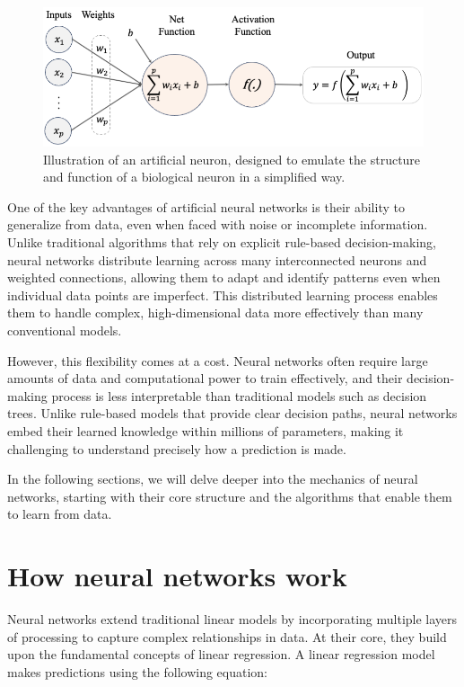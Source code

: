 \documentclass[
]{book}
\theoremstyle{definition}
\theoremstyle{definition}
\theoremstyle{definition}
\theoremstyle{definition}
\theoremstyle{remark}
\begin{document}
\begin{figure}

{\centering \includegraphics[width=0.9\linewidth]{images/net_1} 

}

\caption{Illustration of an artificial neuron, designed to emulate the structure and function of a biological neuron in a simplified way.}\label{fig:net-1}
\end{figure}

One of the key advantages of artificial neural networks is their ability to generalize from data, even when faced with noise or incomplete information. Unlike traditional algorithms that rely on explicit rule-based decision-making, neural networks distribute learning across many interconnected neurons and weighted connections, allowing them to adapt and identify patterns even when individual data points are imperfect. This distributed learning process enables them to handle complex, high-dimensional data more effectively than many conventional models.

However, this flexibility comes at a cost. Neural networks often require large amounts of data and computational power to train effectively, and their decision-making process is less interpretable than traditional models such as decision trees. Unlike rule-based models that provide clear decision paths, neural networks embed their learned knowledge within millions of parameters, making it challenging to understand precisely how a prediction is made.

In the following sections, we will delve deeper into the mechanics of neural networks, starting with their core structure and the algorithms that enable them to learn from data.

\section{How neural networks work}\label{how-neural-networks-work}

Neural networks extend traditional linear models by incorporating multiple layers of processing to capture complex relationships in data. At their core, they build upon the fundamental concepts of linear regression. A linear regression model makes predictions using the following equation:
\end{document}
